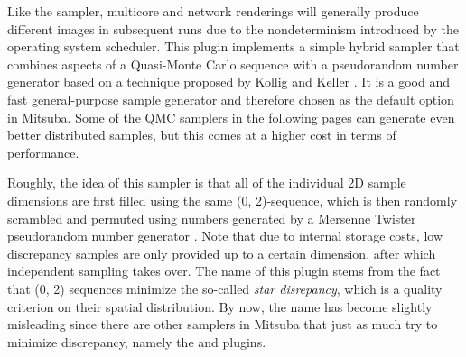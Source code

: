 Like the  sampler, multicore and network renderings
will generally produce different images in subsequent runs due to the nondeterminism
introduced by the operating system scheduler.
\vspace{-2mm}
This plugin implements a simple hybrid sampler that combines aspects of a Quasi-Monte
Carlo sequence with a pseudorandom number generator based on a technique proposed
by Kollig and Keller \cite{Kollig2002Efficient}.
It is a good and fast general-purpose sample generator and therefore chosen as
the default option in Mitsuba. Some of the QMC samplers in the following pages can generate
even better distributed samples, but this comes at a higher cost in terms of performance.

Roughly, the idea of this sampler is that all of the individual 2D sample dimensions are
first filled using the same (0, 2)-sequence, which is then randomly scrambled and permuted
using numbers generated by a Mersenne Twister pseudorandom number generator \cite{Saito2008SIMD}.
Note that due to internal storage costs, low discrepancy samples are only provided
up to a certain dimension, after which independent sampling takes over.
The name of this plugin stems from the fact that (0, 2) sequences minimize the so-called
\emph{star disrepancy}, which is a quality criterion on their spatial distribution. By
now, the name has become slightly misleading since there are other samplers in Mitsuba
that just as much try to minimize discrepancy, namely the  and
 plugins.

